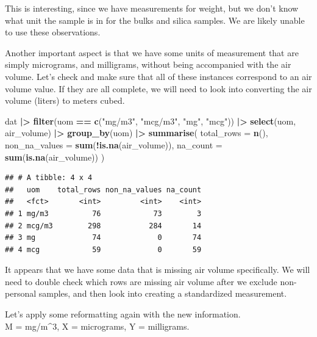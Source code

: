 \documentclass[
]{article}
\newenvironment{Shaded}{\begin{snugshade}}{\end{snugshade}}
\newcommand{\AttributeTok}[1]{\textcolor[rgb]{0.13,0.29,0.53}{#1}}
\newcommand{\FunctionTok}[1]{\textcolor[rgb]{0.13,0.29,0.53}{\textbf{#1}}}
\newcommand{\NormalTok}[1]{#1}
\newcommand{\SpecialCharTok}[1]{\textcolor[rgb]{0.81,0.36,0.00}{\textbf{#1}}}
\newcommand{\StringTok}[1]{\textcolor[rgb]{0.31,0.60,0.02}{#1}}
\begin{document}
This is interesting, since we have measurements for weight, but we don't
know what unit the sample is in for the bulks and silica samples. We are
likely unable to use these observations.

Another important aspect is that we have some units of measurement that
are simply micrograms, and milligrams, without being accompanied with
the air volume. Let's check and make sure that all of these instances
correspond to an air volume value. If they are all complete, we will
need to look into converting the air volume (liters) to meters cubed.

\begin{Shaded}
\begin{Highlighting}[]
\NormalTok{dat }\SpecialCharTok{|\textgreater{}} 
  \FunctionTok{filter}\NormalTok{(uom }\SpecialCharTok{==} \FunctionTok{c}\NormalTok{(}\StringTok{"mg/m3"}\NormalTok{, }\StringTok{"mcg/m3"}\NormalTok{, }\StringTok{"mg"}\NormalTok{, }\StringTok{"mcg"}\NormalTok{)) }\SpecialCharTok{|\textgreater{}} 
  \FunctionTok{select}\NormalTok{(uom, air\_volume) }\SpecialCharTok{|\textgreater{}}
  \FunctionTok{group\_by}\NormalTok{(uom) }\SpecialCharTok{|\textgreater{}}
  \FunctionTok{summarise}\NormalTok{(}
    \AttributeTok{total\_rows =} \FunctionTok{n}\NormalTok{(),}
    \AttributeTok{non\_na\_values =} \FunctionTok{sum}\NormalTok{(}\SpecialCharTok{!}\FunctionTok{is.na}\NormalTok{(air\_volume)),}
    \AttributeTok{na\_count =} \FunctionTok{sum}\NormalTok{(}\FunctionTok{is.na}\NormalTok{(air\_volume))}
\NormalTok{  )}
\end{Highlighting}
\end{Shaded}

\begin{verbatim}
## # A tibble: 4 x 4
##   uom    total_rows non_na_values na_count
##   <fct>       <int>         <int>    <int>
## 1 mg/m3          76            73        3
## 2 mcg/m3        298           284       14
## 3 mg             74             0       74
## 4 mcg            59             0       59
\end{verbatim}

It appears that we have some data that is missing air volume
specifically. We will need to double check which rows are missing air
volume after we exclude non-personal samples, and then look into
creating a standardized measurement.

Let's apply some reformatting again with the new information.\\
M = mg/m\^{}3, X = micrograms, Y = milligrams.
\end{document}
